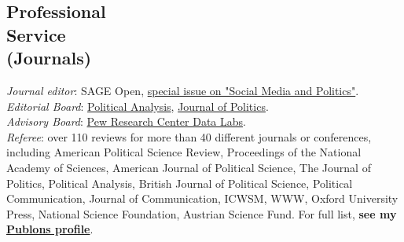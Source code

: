 \documentclass[margin,line,11pt]{resume}
\newcommand{\nl}{\vspace{0.10in}\\}
\begin{document}
\begin{resume}
    
   
    


\section{\mysidestyle Professional\\Service\\(Journals)}

\emph{Journal editor}: SAGE Open, \href{https://journals.sagepub.com/topic/sgo-subjects/3468/sgo}{special issue on "Social Media and Politics"}.\nl
\emph{Editorial Board}: \href{https://www.cambridge.org/core/journals/political-analysis/information/editorial-board}{Political Analysis}, \href{https://www.journals.uchicago.edu/journals/jop/board}{Journal of Politics}.\nl
\emph{Advisory Board}: \href{https://www.pewresearch.org/methods/about-data-labs/}{Pew Research Center Data Labs}.\nl
\newpage
\emph{Referee}: over 110 reviews for more than 40 different journals or conferences, including American Political Science Review, Proceedings of the National Academy of Sciences, American Journal of Political Science, The Journal of Politics, Political Analysis, British Journal of Political Science, Political Communication, Journal of Communication, ICWSM, WWW, Oxford University Press, National Science Foundation, Austrian Science Fund. For full list, \textbf{see my \href{https://publons.com/author/1291880/pablo-barbera}{Publons profile}}.


\end{resume}
\end{document}
